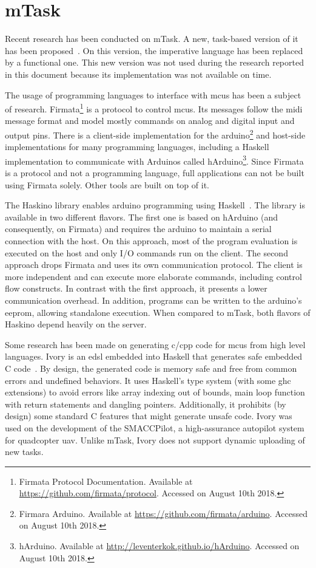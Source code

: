 \section{mTask}

Recent research has been conducted on \gls{mTask}. A new, task-based version of it has been proposed~\cite{micro}. On this version, the imperative language has been replaced by a functional one. This new version was not used during the research reported in this document because its implementation was not available on time.

The usage of programming languages to interface with \glspl{mcu} has been a subject of research. Firmata\footnote{Firmata Protocol Documentation. Available at \url{https://github.com/firmata/protocol}. Accessed on August 10th 2018.} is a protocol to control \glspl{mcu}. Its messages follow the \acs{midi} message format and model mostly commands on analog and digital input and output pins. There is a client-side implementation for the \gls{arduino}\footnote{Firmara Arduino. Available at \url{https://github.com/firmata/arduino}. Accessed on August 10th 2018.} and host-side implementations for many programming languages, including a Haskell implementation to communicate with Arduinos called hArduino\footnote{hArduino. Available at \url{http://leventerkok.github.io/hArduino}. Accessed on August 10th 2018.}. Since Firmata is a protocol and not a programming language, full applications can not be built using Firmata solely. Other tools are built on top of it.

The Haskino library enables \gls{arduino} programming using Haskell~\cite{haskino}. The library is available in two different flavors. The first one is based on hArduino (and consequently, on Firmata) and requires the \gls{arduino} to maintain a serial connection with the host. On this approach, most of the program evaluation is executed on the host and only I/O commands run on the client. The second approach drops Firmata and uses its own communication protocol. The client is more independent and can execute more elaborate commands, including control flow constructs. In contrast with the first approach, it presents a lower communication overhead. In addition, programs can be written to the \gls{arduino}'s \acs{eeprom}, allowing standalone execution. When compared to \gls{mTask}, both flavors of Haskino depend heavily on the server. 

Some research has been made on generating \gls{c}/\gls{cpp} code for \glspl{mcu} from high level languages. Ivory is an \ac{edsl} embedded into Haskell that generates safe embedded C code~\cite{ivory1,ivory2}. By design, the generated code is memory safe and free from common errors and undefined behaviors. It uses Haskell's type system (with some \acs{ghc} extensions) to avoid errors like array indexing out of bounds, main loop function with return statements and dangling pointers. Additionally, it prohibits (by design) some standard C features that might generate unsafe code. Ivory was used on the development of the SMACCPilot, a high-assurance autopilot system for quadcopter \ac{uav}. Unlike \gls{mTask}, Ivory does not support dynamic uploading of new tasks.

